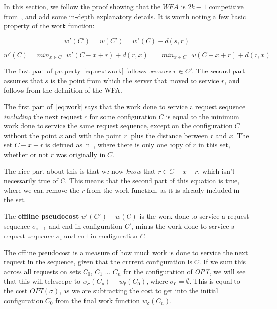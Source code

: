 In this section, we follow the proof showing that the $WFA$ is $2k-1$ competitive from~\cite{OnlineComp1998}, and add some in-depth explanatory details. It is worth noting a few basic property of the work function:

\begin{equation}
    \label{eq:nextwork}
    w'(C') = w(C') = w'(C) - d(s,r)
\end{equation}

\begin{equation}
    \label{eq:work}
    w'(C) = min_{x \in C} [w'(C - x + r) + d(r, x)] = min_{x \in C} [w(C - x + r) + d(r, x)]
\end{equation}

The first part of property~\ref{eq:nextwork} follows because $r \in C'$. The second part assumes that $s$ is the point from which the server that moved to service $r$, and follows from the definition of the WFA.

The first part of~\ref{eq:work} says that the work done to service a request sequence \textit{including} the next request $r$ for some configuration $C$ is equal to the minimum work done to service the same request sequence, except on the configuration $C$ without the point $x$ and with the point $r$, plus the distance between $r$ and $x$. The set $C-x+r$ is defined as in~\cite{OnlineComp1998}, where there is only one copy of $r$ in this set, whether or not $r$ was originally in $C$. 

The nice part about this is that we now \textit{know} that $r \in C - x + r$, which isn't necessarily true of $C$. This means that the second part of this equation is true, where we can remove the $r$ from the work function, as it is already included in the set. 

\begin{definition}
    The \textbf{offline pseudocost} $w'(C') - w(C)$ is the work done to service a request sequence $\sigma_{i+1}$ and end in configuration $C'$, minus the work done to service a request sequence $\sigma_i$ and end in configuration $C$.
\end{definition}

The offline pseudocost is a measure of how much work is done to service the next request in the sequence, given that the current configuration is $C$. If we sum this across all requests on sets $C_0$, $C_1$ ... $C_n$ for the configuration of \textit{OPT}, we will see that this will telescope to $w_{\sigma}(C_n) - w_{\emptyset}(C_0)$, where $\sigma_0 = \emptyset$. This is equal to the cost $OPT(\sigma)$, as we are subtracting the cost to get into the initial configuration $C_0$ from the final work function $w_\sigma(C_n)$.

